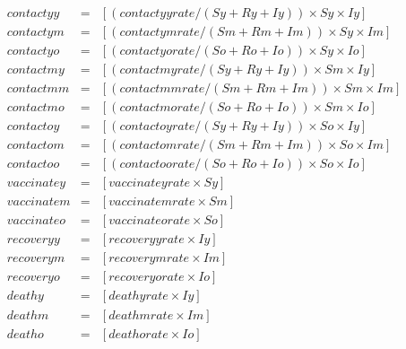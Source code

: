 \begin{eqnarray*}
\mathit{contactyy} & = & [(\mathit{contactyyrate}/(\mathit{Sy} + \mathit{Ry} + \mathit{Iy}))\times \mathit{Sy}\times \mathit{Iy}]\\%
\mathit{contactym} & = & [(\mathit{contactymrate}/(\mathit{Sm} + \mathit{Rm} + \mathit{Im}))\times \mathit{Sy}\times \mathit{Im}]\\%
\mathit{contactyo} & = & [(\mathit{contactyorate}/(\mathit{So} + \mathit{Ro} + \mathit{Io}))\times \mathit{Sy}\times \mathit{Io}]\\%
\mathit{contactmy} & = & [(\mathit{contactmyrate}/(\mathit{Sy} + \mathit{Ry} + \mathit{Iy}))\times \mathit{Sm}\times \mathit{Iy}]\\%
\mathit{contactmm} & = & [(\mathit{contactmmrate}/(\mathit{Sm} + \mathit{Rm} + \mathit{Im}))\times \mathit{Sm}\times \mathit{Im}]\\%
\mathit{contactmo} & = & [(\mathit{contactmorate}/(\mathit{So} + \mathit{Ro} + \mathit{Io}))\times \mathit{Sm}\times \mathit{Io}]\\%
\mathit{contactoy} & = & [(\mathit{contactoyrate}/(\mathit{Sy} + \mathit{Ry} + \mathit{Iy}))\times \mathit{So}\times \mathit{Iy}]\\%
\mathit{contactom} & = & [(\mathit{contactomrate}/(\mathit{Sm} + \mathit{Rm} + \mathit{Im}))\times \mathit{So}\times \mathit{Im}]\\%
\mathit{contactoo} & = & [(\mathit{contactoorate}/(\mathit{So} + \mathit{Ro} + \mathit{Io}))\times \mathit{So}\times \mathit{Io}]\\%
\mathit{vaccinatey} & = & [\mathit{vaccinateyrate}\times \mathit{Sy}]\\%
\mathit{vaccinatem} & = & [\mathit{vaccinatemrate}\times \mathit{Sm}]\\%
\mathit{vaccinateo} & = & [\mathit{vaccinateorate}\times \mathit{So}]\\%
\mathit{recoveryy} & = & [\mathit{recoveryyrate}\times \mathit{Iy}]\\%
\mathit{recoverym} & = & [\mathit{recoverymrate}\times \mathit{Im}]\\%
\mathit{recoveryo} & = & [\mathit{recoveryorate}\times \mathit{Io}]\\%
\mathit{deathy} & = & [\mathit{deathyrate}\times \mathit{Iy}]\\%
\mathit{deathm} & = & [\mathit{deathmrate}\times \mathit{Im}]\\%
\mathit{deatho} & = & [\mathit{deathorate}\times \mathit{Io}]\\%

\end{eqnarray*}
